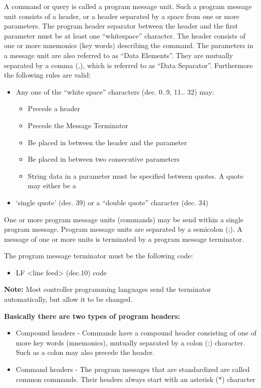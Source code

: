 A command or query is called a program message unit. Such a program message unit consists of a header, or a header separated by a space from one or more parameters. The program header separator between the header and the first parameter must be at least one ``whitespace'' character. The header consists of one or more mnemonics (key words) describing the command. The parameters in a message unit are also referred to as ``Data Elements''. They are mutually separated by a comma (,), which is referred to as ``Data Separator''. Furthermore the following rules are valid:

\begin{itemize}
\item Any one of the ``white space'' characters (dec. 0..9, 11.. 32) may:
\begin{itemize}
\item Precede a header
\item Precede the Message Terminator
\item Be placed in between the header and the parameter
\item Be placed in between two consecutive parameters
\item String data in a parameter must be specified between quotes. A quote may either be a
\end{itemize}
\item `single quote' (dec. 39) or a ``double quote'' character (dec. 34)
\end{itemize}

One or more program message units (commands) may be send within a single program message. Program message units are separated by a semicolon (;). A message of one or more units is terminated by a program message terminator.

The program message terminator must be the following code:
\begin{itemize}
\item LF <line feed> (dec.10) code
\end{itemize}

\textbf{Note:} Most controller programming languages send the terminator automatically, but allow it to be changed.

\textbf{Basically there are two types of program headers:}
\begin{itemize}
\item Compound headers - Commands have a compound header consisting of one of more key words (mnemonics), mutually separated by a colon (:) character. Such as a colon may also precede the header.
\item Command headers - The program messages that are standardized are called common commands. Their headers always start with an asterisk (*) character 
\end{itemize}

